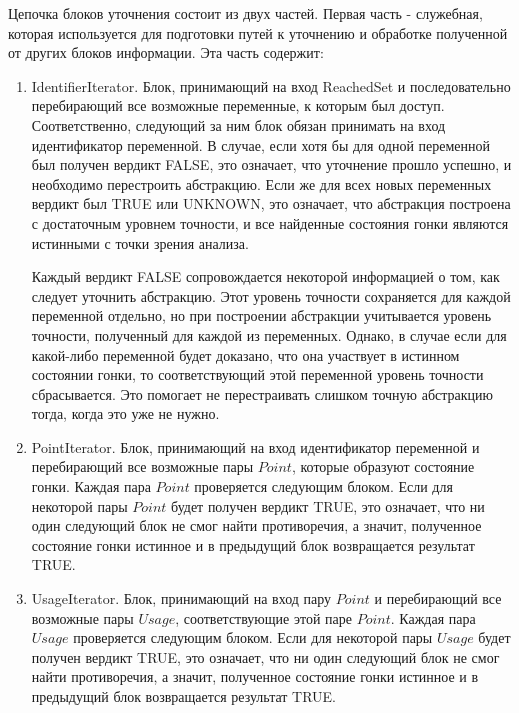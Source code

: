 Цепочка блоков уточнения состоит из двух частей. Первая часть - служебная, которая используется для подготовки путей к уточнению и обработке полученной от других блоков информации. Эта часть содержит:

\begin{enumerate}

\item IdentifierIterator. Блок, принимающий на вход ReachedSet и последовательно перебирающий все возможные переменные, к которым был доступ.
Соответственно, следующий за ним блок обязан принимать на вход идентификатор переменной.
В случае, если хотя бы для одной переменной был получен вердикт FALSE, это означает, что уточнение прошло успешно, и необходимо перестроить абстракцию.
Если же для всех новых переменных вердикт был TRUE или UNKNOWN, это означает, что абстракция построена с достаточным уровнем точности, и все найденные состояния гонки являются истинными с точки зрения анализа.

Каждый вердикт FALSE сопровождается некоторой информацией о том, как следует уточнить абстракцию. Этот уровень точности сохраняется для каждой переменной отдельно, но при построении абстракции учитывается уровень точности, полученный для каждой из переменных. Однако, в случае если для  какой-либо переменной будет доказано, что она участвует в истинном состоянии гонки, то соответствующий этой переменной уровень точности сбрасывается. Это помогает не перестраивать слишком точную абстракцию тогда, когда это уже не нужно.

\item PointIterator. Блок, принимающий на вход идентификатор переменной и перебирающий все возможные пары $Point$, которые образуют состояние гонки. Каждая пара $Point$ проверяется следующим блоком. Если для некоторой пары $Point$ будет получен вердикт TRUE, это означает, что ни один следующий блок не смог найти противоречия, а значит, полученное состояние гонки истинное и в предыдущий блок возвращается результат TRUE. 

\item UsageIterator. Блок, принимающий на вход пару $Point$ и перебирающий все возможные пары $Usage$, соответствующие этой паре $Point$. Каждая пара $Usage$ проверяется следующим блоком. Если для некоторой пары $Usage$ будет получен вердикт TRUE, это означает, что ни один следующий блок не смог найти противоречия, а значит, полученное состояние гонки истинное и в предыдущий блок возвращается результат TRUE. 


\end{enumerate}
